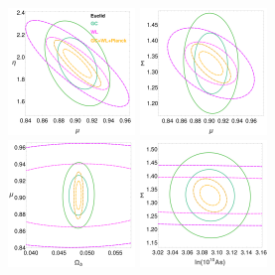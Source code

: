\begin{figure}[htbp]
\centering{}
\includegraphics[width=0.3\textwidth]{Chapters/linear-nonlinear-MG-forecasts/figures/ellipses/T-related/ellipsesPlot-withLegend-Manual-MuEtaFisher-Marged-fiducialMGTR2nonuhs-GC_WL_GC+WL+Planck--nlHS-pars-6-7_-.pdf}
\includegraphics[width=0.3\textwidth]{Chapters/linear-nonlinear-MG-forecasts/figures/ellipses/T-related/ellipsesPlot-noLegend-Manual-MuSigmaFisher-Marged-fiducialMGTR2nonuhs-GC_WL_GC+WL+Planck--nlHS-pars-6-7_-.pdf}
\\
\includegraphics[width=0.3\textwidth]{Chapters/linear-nonlinear-MG-forecasts/figures/ellipses/T-related/ellipsesPlot-noLegend-Manual-MuSigmaFisher-Marged-fiducialMGTR2nonuhs-GC_WL_GC+WL+Planck--nlHS-pars-2-6_-.pdf}
\includegraphics[width=0.3\textwidth]{Chapters/linear-nonlinear-MG-forecasts/figures/ellipses/T-related/ellipsesPlot-noLegend-Manual-MuSigmaFisher-Marged-fiducialMGTR2nonuhs-GC_WL_GC+WL+Planck--nlHS-pars-4-7_-.pdf}

\end{figure}
